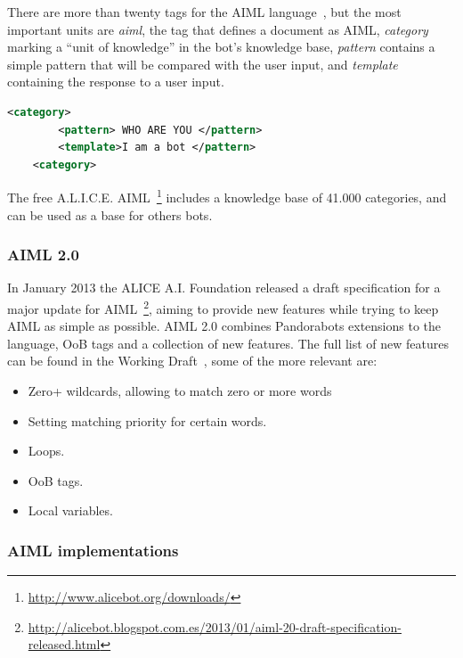 There are more than twenty tags for the AIML language~\cite{aliceaiml}, but the most important units are \emph{aiml}, the tag that defines a document as \ac{AIML}, \emph{category} marking a ``unit of knowledge'' in the bot's knowledge base, \emph{pattern} contains a simple pattern that will be compared with the user input, and \emph{template} containing the response to a user input.

\begin{center} 
  \begin{lstlisting}[language=XML, captionpos=b, caption=Example AIML code, label=listing:exampleaiml]   
    <category>
        <pattern> WHO ARE YOU </pattern>
        <template>I am a bot </pattern>
    <category>
 \end{lstlisting}
\end{center}
The free A.L.I.C.E. \ac{AIML}~\footnote{\url{http://www.alicebot.org/downloads/}} includes a knowledge base of 41.000 categories, and can be used as a base for others bots.

\subsubsection{\ac{AIML} 2.0}

In January 2013 the ALICE A.I. Foundation released a draft specification for a major update for \ac{AIML}~\footnote{\url{http://alicebot.blogspot.com.es/2013/01/aiml-20-draft-specification-released.html}}, aiming to provide new features while trying to keep \ac{AIML} as simple as possible. \ac{AIML} 2.0 combines Pandorabots extensions to the language, \ac{OoB} tags and a collection of new features. The full list of new features can be found in the Working Draft~\cite{aiml20draft}, some of the more relevant are:

\begin{itemize}%
  \item Zero+ wildcards, allowing to match zero or more words
  \item Setting matching priority for certain words.
  \item Loops.
  \item \ac{OoB} tags.
  \item Local variables.
\end{itemize}

\subsubsection{\ac{AIML} implementations}

